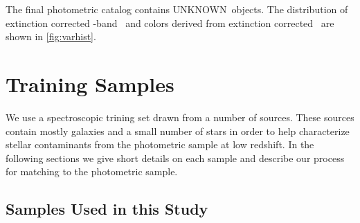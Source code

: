 \documentclass{emulateapj}
\newcommand{\nphoto}{{\color{red} UNKNOWN}}
\begin{document}
The final photometric catalog contains \nphoto\ objects.  The distribution of
extinction corrected \rmag-band \cmodelmag\ and colors derived from extinction
corrected \modelmag\ are shown in \ref{fig:varhist}.

\section{Training Samples} \label{sec:train}

We use a spectroscopic trining set drawn from a number of sources. These
sources contain mostly galaxies and a small number of stars in order to help
characterize stellar contaminants from the photometric sample at low redshift.
In the following sections we give short details on each sample and describe our
process for matching to the photometric sample.

\subsection{Samples Used in this Study} \label{sec:train:def}
\end{document}
